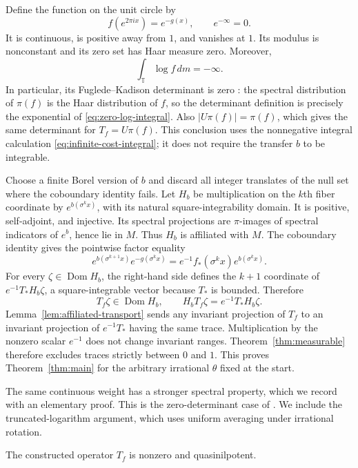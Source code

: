 Define the function on the unit circle by
\[
 f(e^{2\pi i x})=e^{-g(x)},\qquad e^{-\infty}=0.
\]
It is continuous, is positive away from $1$, and vanishes at $1$.
Its modulus is nonconstant and its zero set has Haar measure zero.  Moreover,
\begin{equation}\label{eq:zero-log-integral}
 \int_{\mathbb T}\log f\,dm=-\infty.
\end{equation}
In particular, its Fuglede--Kadison determinant is zero
\cite{fuglede-kadison}: the spectral distribution of $\pi(f)$ is the
Haar distribution of $f$, so the determinant definition is precisely the
exponential of \eqref{eq:zero-log-integral}.  Also $|U\pi(f)|=\pi(f)$,
which gives the same determinant for $T_f=U\pi(f)$.  This conclusion uses
the nonnegative integral calculation \eqref{eq:infinite-cost-integral};
it does not require the transfer $b$ to be integrable.

Choose a finite Borel version of $b$ and discard all integer translates
of the null set where the coboundary identity fails.
Let $H_b$ be multiplication on the $k$th fiber coordinate by
$e^{b(\sigma^k x)}$, with its natural square-integrability domain.  It is
positive, self-adjoint, and injective.  Its spectral projections are
$\pi$-images of spectral indicators of $e^b$, hence lie in $M$.  Thus
$H_b$ is affiliated with $M$.  The coboundary identity gives the pointwise
factor equality
\[
 e^{b(\sigma^{k+1}x)}e^{-g(\sigma^k x)}
       =e^{-1}f_*(\sigma^k x)e^{b(\sigma^k x)}.
\]
For every $\zeta\in\operatorname{Dom}H_b$, the right-hand side defines
the $k+1$ coordinate of $e^{-1}T_*H_b\zeta$, a square-integrable vector
because $T_*$ is bounded.  Therefore
\[
 T_f\zeta\in\operatorname{Dom}H_b,
 \qquad H_bT_f\zeta=e^{-1}T_*H_b\zeta.
\]
Lemma~\ref{lem:affiliated-transport} sends any invariant projection of
$T_f$ to an invariant projection of $e^{-1}T_*$ having the same trace.
Multiplication by the nonzero scalar $e^{-1}$ does not change invariant
ranges.  Theorem~\ref{thm:measurable} therefore excludes traces strictly
between $0$ and $1$.  This proves Theorem~\ref{thm:main} for the arbitrary
irrational $\theta$ fixed at the start.

The same continuous weight has a stronger spectral property, which we
record with an elementary proof.  This is the zero-determinant case of
\citet[Theorem~2.3]{zfs}.  We include the truncated-logarithm argument,
which uses uniform averaging under irrational rotation.

\begin{corollary}\label{cor:quasinilpotent}
The constructed operator $T_f$ is nonzero and quasinilpotent.
\end{corollary}


